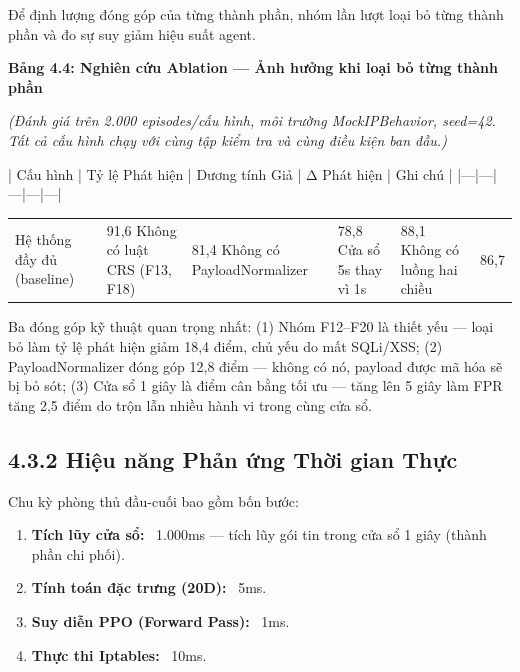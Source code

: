 \documentclass[12pt,a4paper,twoside]{report}
\begin{document}
{{{{{{Để định lượng đóng góp của từng thành phần, nhóm lần lượt loại bỏ từng thành phần và đo sự suy giảm hiệu suất agent.

\textbf{Bảng 4.4: Nghiên cứu Ablation — Ảnh hưởng khi loại bỏ từng thành phần}

\textit{(Đánh giá trên 2.000 episodes/cấu hình, môi trường MockIPBehavior, seed=42. Tất cả cấu hình chạy với cùng tập kiểm tra và cùng điều kiện ban đầu.)}

| Cấu hình | Tỷ lệ Phát hiện | Dương tính Giả | Δ Phát hiện | Ghi chú |
|---|---|---|---|---|


\begin{tabular}{p{2.5cm}p{2.5cm}p{2.5cm}p{2.5cm}}
\hline
Hệ thống đầy đủ (baseline) & 91,6%
\hline
Không có luật CRS (F13, F18) & 81,4%
Không có PayloadNormalizer & 78,8%
Cửa sổ 5s thay vì 1s & 88,1%
Không có luồng hai chiều & 86,7%
\hline
\end{tabular}

Ba đóng góp kỹ thuật quan trọng nhất: (1) Nhóm F12–F20 là thiết yếu — loại bỏ làm tỷ lệ phát hiện giảm 18,4 điểm, chủ yếu do mất SQLi/XSS; (2) PayloadNormalizer đóng góp 12,8 điểm — không có nó, payload được mã hóa sẽ bị bỏ sót; (3) Cửa sổ 1 giây là điểm cân bằng tối ưu — tăng lên 5 giây làm FPR tăng 2,5 điểm do trộn lẫn nhiều hành vi trong cùng cửa sổ.

\subsection{4.3.2 Hiệu năng Phản ứng Thời gian Thực}

Chu kỳ phòng thủ đầu-cuối bao gồm bốn bước:

\begin{enumerate}
\item \textbf{Tích lũy cửa sổ:} ~1.000ms — tích lũy gói tin trong cửa sổ 1 giây (thành phần chi phối).
\item \textbf{Tính toán đặc trưng (20D):} ~5ms.
\item \textbf{Suy diễn PPO (Forward Pass):} ~1ms.
\item \textbf{Thực thi Iptables:} ~10ms.
\end{enumerate}

}}}}}}
\end{document}
